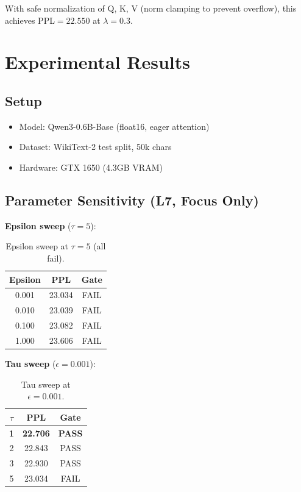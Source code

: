 \documentclass[11pt]{article}
\begin{document}
With safe normalization of Q, K, V (norm clamping to prevent overflow), this achieves PPL$=22.550$ at $\lambda=0.3$.

\section{Experimental Results}

\subsection{Setup}

\begin{itemize}
  \item Model: Qwen3-0.6B-Base (float16, eager attention)
  \item Dataset: WikiText-2 test split, 50k chars
  \item Hardware: GTX 1650 (4.3GB VRAM)
\end{itemize}

\subsection{Parameter Sensitivity (L7, Focus Only)}

\textbf{Epsilon sweep} ($\tau=5$):

\begin{table}[h]
\centering
\caption{Epsilon sweep at $\tau=5$ (all fail).}
\begin{tabular}{ccc}
\toprule
Epsilon & PPL & Gate \\
\midrule
0.001 & 23.034 & FAIL \\
0.010 & 23.039 & FAIL \\
0.100 & 23.082 & FAIL \\
1.000 & 23.606 & FAIL \\
\bottomrule
\end{tabular}
\end{table}

\textbf{Tau sweep} ($\epsilon=0.001$):

\begin{table}[h]
\centering
\caption{Tau sweep at $\epsilon=0.001$.}
\begin{tabular}{ccc}
\toprule
$\tau$ & PPL & Gate \\
\midrule
\textbf{1} & \textbf{22.706} & \textbf{PASS} \\
2 & 22.843 & PASS \\
3 & 22.930 & PASS \\
5 & 23.034 & FAIL \\
\bottomrule
\end{tabular}
\end{table}
\end{document}
